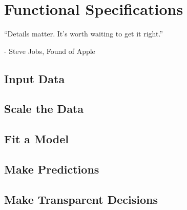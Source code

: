 
\chapter{Functional Specifications}
\label{ch:functional_specifications}
\epigraph{“Details matter. It’s worth waiting to get it right.”}{- Steve Jobs, Found of Apple}

\section{Input Data}
\label{sec:input_data}

\section{Scale the Data}
\label{sec:Scaling_the_data}

\section{Fit a Model}
\label{sec:fit_a_model}

\section{Make Predictions}
\label{make_predictions}

\section{Make Transparent Decisions}
\label{make_transparent_decisions}


